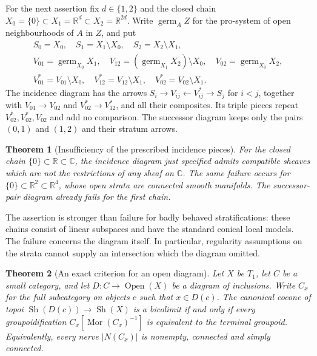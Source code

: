 \documentclass[11pt,a4paper]{article}
\newtheorem{theorem}{Theorem}[section]
\theoremstyle{definition}
\newcommand{\Sh}{\operatorname{Sh}}
\newcommand{\R}{\mathbb R}
\newcommand{\C}{\mathbb C}
\begin{document}
For the next assertion fix $d\in\{1,2\}$ and the closed chain
$X_0=\{0\}\subset X_1=\R^d\subset X_2=\R^{2d}$.
Write $\operatorname{germ}_A Z$ for the pro-system of open
neighbourhoods of $A$ in $Z$, and put
\[
\begin{gathered}
 S_0=X_0,\quad S_1=X_1\setminus X_0,\quad S_2=X_2\setminus X_1,\\
 V_{01}=\operatorname{germ}_{X_0}X_1,\quad
 V_{12}=(\operatorname{germ}_{X_1}X_2)\setminus X_0,\quad
 V_{02}=\operatorname{germ}_{X_0}X_2,\\
 V_{01}^*=V_{01}\setminus X_0,\quad
 V_{12}^*=V_{12}\setminus X_1,\quad
 V_{02}^*=V_{02}\setminus X_1.
\end{gathered}
\]
The incidence diagram has the arrows
$S_i\to V_{ij}\leftarrow V_{ij}^*\to S_j$ for $i<j$,
together with $V_{01}\to V_{02}$ and $V_{02}^*\to V_{12}^*$,
and all their composites. Its triple pieces repeat
$V_{02}^*,V_{02}^*,V_{02}$ and add no comparison.
The successor diagram keeps only the pairs $(0,1)$ and $(1,2)$
and their stratum arrows.

\begin{theorem}[Insufficiency of the prescribed incidence pieces]\label{thm:stones}
For the closed chain $\{0\}\subset\R\subset\C$, the incidence diagram just specified admits compatible sheaves which are not the restrictions of any sheaf on $\C$. The same failure occurs for $\{0\}\subset\R^2\subset\R^4$, whose open strata are connected smooth manifolds. The successor-pair diagram already fails for the first chain.
\end{theorem}

The assertion is stronger than failure for badly behaved stratifications: these chains consist of linear subspaces and have the standard conical local models. The failure concerns the diagram itself. In particular, regularity assumptions on the strata cannot supply an intersection which the diagram omitted.

\begin{theorem}[An exact criterion for an open diagram]\label{thm:membership}
Let $X$ be $T_1$, let $C$ be a small category, and let $D:C\to\operatorname{Open}(X)$ be a diagram of inclusions. Write $C_x$ for the full subcategory on objects $c$ such that $x\in D(c)$. The canonical cocone of topoi $\Sh(D(c))\to\Sh(X)$ is a bicolimit if and only if every groupoidification $C_x[\operatorname{Mor}(C_x)^{-1}]$ is equivalent to the terminal groupoid. Equivalently, every nerve $|N(C_x)|$ is nonempty, connected and simply connected.
\end{theorem}
\end{document}
